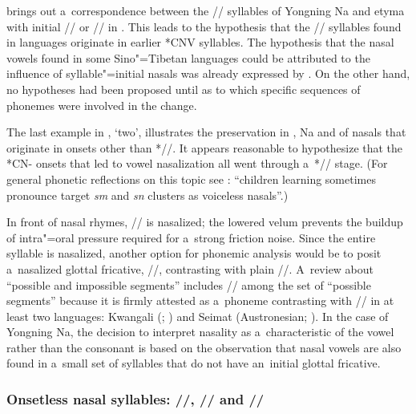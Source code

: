 			 brings out
			a~correspondence between the // syllables of Yongning Na and etyma with initial
			// or // in . This leads to the hypothesis that the // syllables found in  languages originate in earlier *CNV syllables. The hypothesis that the nasal vowels
			found in some Sino"=Tibetan languages could be attributed to the influence of syllable"=initial
			nasals was already expressed by \citet{huang1991a}. On the other hand, no hypotheses had been
			proposed until \citet{michaudetal2012b} as to which specific sequences of phonemes were involved in the change.
			
			The last example in ,
			‘two’, illustrates the preservation in , Na and  of nasals that originate in onsets other
			than *//. It appears reasonable to hypothesize that the *CN- onsets that led to vowel
			nasalization all went through a~*// stage. (For general phonetic reflections on this topic see
			\citealt[233]{ohalaetal1993}: “children learning  sometimes pronounce target \textit{sm} and
			\textit{sn} clusters as voiceless nasals”.)
			
			In front of nasal rhymes, // is nasalized; the lowered velum prevents the buildup of
			intra"=oral pressure required for a~strong friction noise. Since the entire syllable is nasalized,
			another option for phonemic analysis would be to posit a~nasalized glottal fricative,
			//, contrasting with plain //. A~review about “possible and impossible segments” \citep{walkeretal1999} includes // among the set of “possible segments” because it is firmly attested as a~phoneme contrasting with // in at least two languages: Kwangali (; \citealt[132-133]{ladefogedetal1996}) and Seimat (Austronesian; \citealt{blust1998}). In the case of Yongning Na, the decision to interpret nasality as a~characteristic of the vowel rather than the consonant is based on the observation that nasal vowels are also found in a~small set of
			syllables that do not have an~initial glottal fricative.
			
			
			\subsubsection{Onsetless nasal syllables:  //,  // and  //}
			\label{sec:onsetlessnasalsyllables}
			
